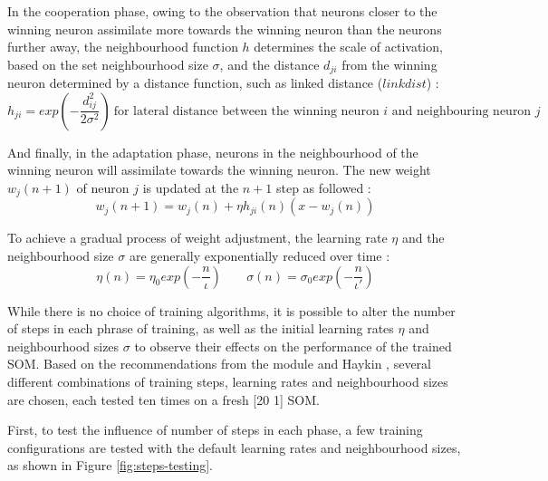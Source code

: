 \documentclass[10pt, oneside]{article}
\begin{document}
In the cooperation phase, owing to the observation that neurons closer to the winning neuron assimilate more towards the winning neuron than the neurons further away, the neighbourhood function $h$ determines the scale of activation, based on the set neighbourhood size $\sigma$, and the distance $d_{ji}$ from the winning neuron determined by a distance function, such as linked distance ($linkdist$) \cite[p. 431]{haykin2008}:
\begin{equation}
h_{ji} = exp(-\frac{d^2_{ij}}{2\sigma^2}) \ \text{for lateral distance between the winning neuron $i$ and neighbouring neuron $j$}
\end{equation}

And finally, in the adaptation phase, neurons in the neighbourhood of the winning neuron will assimilate towards the winning neuron. The new weight $w_j(n+1)$ of neuron $j$ is updated at the $n+1$ step as followed \cite[p. 21]{som-lecture}:
\begin{equation}
w_j(n+1) = w_j(n) + \eta h_{ji}(n)(x-w_j(n))
\end{equation}

To achieve a gradual process of weight adjustment, the learning rate $\eta$ and the neighbourhood size $\sigma$ are generally exponentially reduced over time \cite[pp. 21-22]{som-lecture}:
\begin{equation}
\eta (n) = \eta_0 exp(-\frac{n}{\iota}) \;\;\;\;\;\;\;  \sigma (n) = \sigma_0 exp(-\frac{n}{\iota'})
\end{equation}

While there is no choice of training algorithms, it is possible to alter the number of steps in each phrase of training, as well as the initial learning rates $\eta$ and neighbourhood sizes $\sigma$ to observe their effects on the performance of the trained SOM. Based on the recommendations from the module \cite{som-lecture} and Haykin \cite{haykin2008}, several different combinations of training steps, learning rates and neighbourhood sizes are chosen, each tested ten times on a fresh [20 1] SOM. 

First, to test the influence of number of steps in each phase, a few training configurations are tested with the default learning rates and neighbourhood sizes, as shown in Figure \ref{fig:steps-testing}.
\end{document}
